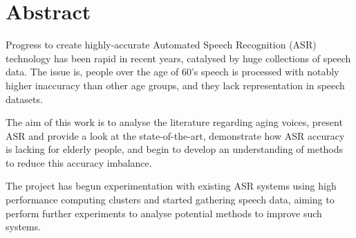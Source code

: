 \chapter*{\Large \center Abstract}

Progress to create highly-accurate Automated Speech Recognition (ASR) technology has been rapid
in recent years, catalysed by huge collections of speech data.
The issue is, people over the age of 60's speech is processed with notably higher inaccuracy
than other age groups, and they lack representation in speech datasets.

The aim of this work is to analyse the literature regarding aging voices, present ASR and
provide a look at the state-of-the-art, demonstrate how ASR accuracy is lacking for elderly
people, and begin to develop an understanding of methods to reduce this accuracy imbalance.

The project has begun experimentation with existing ASR systems using high performance
computing clusters and started gathering speech data, aiming to perform further experiments to
analyse potential methods to improve such systems.
